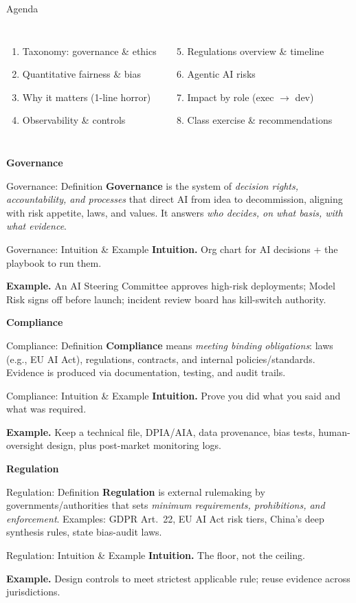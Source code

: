 \documentclass[11pt,aspectratio=169]{beamer}
\newcommand{\Term}[1]{%
  \begin{frame}
    \centering\vfill
    {\usebeamerfont{title}\usebeamercolor[fg]{title}\Huge\textbf{#1}}
    \vfill
  \end{frame}
}
\renewcommand{\Definition}[2]{%
    \begin{frame}{#1: \;Definition}
      \justifying
      #2
    \end{frame}
  }
\newcommand{\Definition}[2]{%
    \begin{frame}{#1: \;Definition}
      \justifying
      #2
    \end{frame}
  }
\newcommand{\Intuition}[3]{%
  \begin{frame}{#1: \;Intuition \& Example}
    \justifying
    \textbf{Intuition.} #2
    \medskip

    \textbf{Example.} #3
  \end{frame}
}
\begin{document}
\begin{frame}{Agenda}
\begin{columns}[T,onlytextwidth]
\begin{enumerate}
  \item Taxonomy: governance \& ethics
  \item Quantitative fairness \& bias
  \item Why it matters (1-line horror)
  \item Observability \& controls
\end{enumerate}
\begin{enumerate}
  \setcounter{enumi}{4}
  \item Regulations overview \& timeline
  \item Agentic AI risks
  \item Impact by role (exec $\rightarrow$ dev)
  \item Class exercise \& recommendations
\end{enumerate}
\end{columns}
\end{frame}

\Term{Governance}
\Definition{Governance}{\justifying
\textbf{Governance} is the system of \emph{decision rights, accountability, and processes} that direct AI from idea to decommission, aligning with risk appetite, laws, and values. It answers \emph{who decides, on what basis, with what evidence}.}
\Intuition{Governance}{Org chart for AI decisions + the playbook to run them.}{An AI Steering Committee approves high-risk deployments; Model Risk signs off before launch; incident review board has kill-switch authority.}

\Term{Compliance}
\Definition{Compliance}{\justifying
\textbf{Compliance} means \emph{meeting binding obligations}: laws (e.g., EU AI Act), regulations, contracts, and internal policies/standards. Evidence is produced via documentation, testing, and audit trails.}
\Intuition{Compliance}{Prove you did what you said and what was required.}{Keep a technical file, DPIA/AIA, data provenance, bias tests, human-oversight design, plus post-market monitoring logs.}

\Term{Regulation}
\Definition{Regulation}{\justifying
\textbf{Regulation} is external rulemaking by governments/authorities that sets \emph{minimum requirements, prohibitions, and enforcement}. Examples: GDPR Art.\ 22, EU AI Act risk tiers, China’s deep synthesis rules, state bias-audit laws.}
\Intuition{Regulation}{The floor, not the ceiling.}{Design controls to meet strictest applicable rule; reuse evidence across jurisdictions.}
\end{document}

